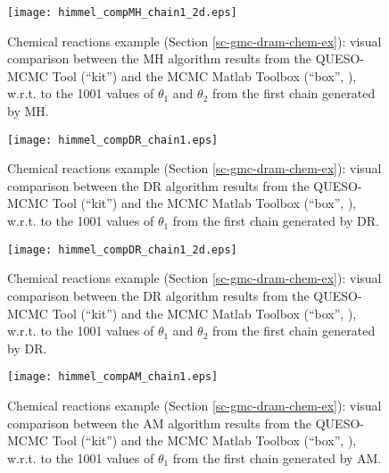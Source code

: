 \begin{figure}[h!]
\begin{center}
\texttt{[image: himmel\_compMH\_chain1\_2d.eps]}
\end{center}
\caption{Chemical reactions example (Section \ref{sc-gmc-dram-chem-ex}):
visual comparison between the MH algorithm results from the QUESO-MCMC Tool (``kit'') and the MCMC Matlab Toolbox (``box'', \cite{mcmctool}), w.r.t. to the 1001 values of $\theta_1$ and $\theta_2$ from the first chain generated by MH.
}
\label{fig-dram-chem-ex-comparison-MH-theta1-chain1-2d}
\end{figure}

\begin{figure}[h!]
\begin{center}
\texttt{[image: himmel\_compDR\_chain1.eps]}
\end{center}
\caption{Chemical reactions example (Section \ref{sc-gmc-dram-chem-ex}):
visual comparison between the DR algorithm results from the QUESO-MCMC Tool (``kit'') and the MCMC Matlab Toolbox (``box'', \cite{mcmctool}), w.r.t. to the 1001 values of $\theta_1$ from the first chain generated by DR.
}
\label{fig-dram-chem-ex-comparison-DR-theta1-chain1}
\end{figure}

\begin{figure}[h!]
\begin{center}
\texttt{[image: himmel\_compDR\_chain1\_2d.eps]}
\end{center}
\caption{Chemical reactions example (Section \ref{sc-gmc-dram-chem-ex}):
visual comparison between the DR algorithm results from the QUESO-MCMC Tool (``kit'') and the MCMC Matlab Toolbox (``box'', \cite{mcmctool}), w.r.t. to the 1001 values of $\theta_1$ and $\theta_2$ from the first chain generated by DR.
}
\label{fig-dram-chem-ex-comparison-DR-theta1-chain1-2d}
\end{figure}

\begin{figure}[h!]
\begin{center}
\texttt{[image: himmel\_compAM\_chain1.eps]}
\end{center}
\caption{Chemical reactions example (Section \ref{sc-gmc-dram-chem-ex}):
visual comparison between the AM algorithm results from the QUESO-MCMC Tool (``kit'') and the MCMC Matlab Toolbox (``box'', \cite{mcmctool}), w.r.t. to the 1001 values of $\theta_1$ from the first chain generated by AM.
}
\label{fig-dram-chem-ex-comparison-AM-theta1-chain1}
\end{figure}

